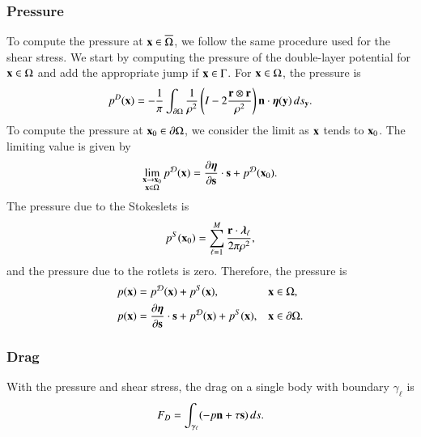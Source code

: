 \documentclass[preprint, 10pt]{elsarticle}
\begin{document}
\subsubsection{Pressure}
To compute the pressure at ${\mathbf{x}} \in \overline{\Omega}$, we follow the
same procedure used for the shear stress.  We start by computing the
pressure of the double-layer potential for ${\mathbf{x}} \in \Omega$ and add the
appropriate jump if ${\mathbf{x}} \in \Gamma$. For ${\mathbf{x}} \in \Omega$, the pressure
is
\begin{align}
  p^{D}({\mathbf{x}}) = -\frac{1}{\pi}\int_{{\partial}\Omega} \frac{1}{\rho^2}
    \left(I - 2 \frac{{\mathbf{r}} \otimes {\mathbf{r}}}{\rho^2}\right) 
    {\mathbf{n}} \cdot {\boldsymbol\eta}({\mathbf{y}}) \,ds_{\mathbf{y}}.
    \label{eqn:pressureDLP}
\end{align}
To compute the pressure at ${\mathbf{x}}_0 \in {\partial}\Omega$, we consider the limit
as ${\mathbf{x}}$ tends to ${\mathbf{x}}_0$.  The limiting value is given
by~\cite{qua-bir2014a}
\begin{align}
  \lim_{\substack{{\mathbf{x}} \rightarrow {\mathbf{x}}_0 \\ {\mathbf{x}} \in \Omega}}p^{\mathcal{D}}({\mathbf{x}}) =  
    \frac{\partial {\boldsymbol\eta}}{\partial {\mathbf{s}}} \cdot {\mathbf{s}} + p^{{\mathcal{D}}}({\mathbf{x}}_0).
  \label{eqn:pressureJump}
\end{align}
The pressure due to the Stokeslets is
\begin{align}
  p^S({\mathbf{x}}_0) = \sum_{\ell=1}^{M}\frac{{\mathbf{r}} \cdot {\boldsymbol\lambda}_\ell}{2\pi\rho^2},
  \label{eqn:shearPressureSR}
\end{align}
and the pressure due to the rotlets is zero.  Therefore, the pressure is
\begin{align*}
  p({\mathbf{x}}) &= p^{{\mathcal{D}}}({\mathbf{x}}) + p^{S}({\mathbf{x}}), \quad &&{\mathbf{x}} \in \Omega,\\
  p({\mathbf{x}}) &= \frac{\partial {\boldsymbol\eta}}{\partial {\mathbf{s}}} \cdot {\mathbf{s}} + p^{{\mathcal{D}}}({\mathbf{x}}) + 
              p^{S}({\mathbf{x}}), && {\mathbf{x}} \in {\partial}\Omega.
\end{align*}

\subsubsection{Drag}
With the pressure and shear stress, the drag on a single body with
boundary $\gamma_\ell$ is
\begin{align}
  F_D = \int_{\gamma_\ell} (-p {\mathbf{n}} + \tau {\mathbf{s}})\,ds.
  \label{eqn:drag}
\end{align}
\end{document}
